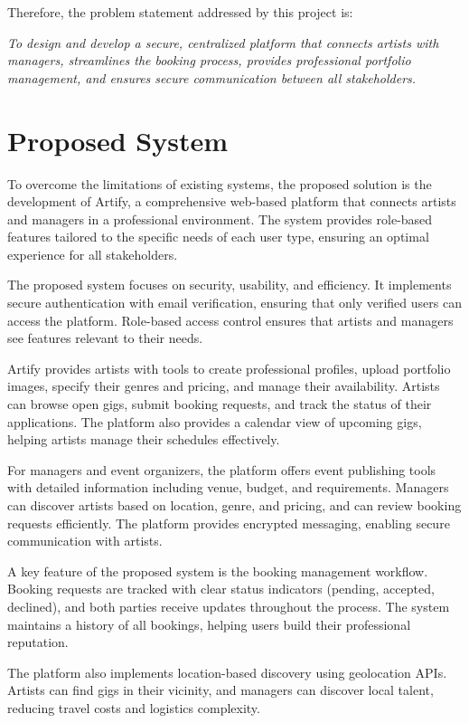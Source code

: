 \documentclass[12pt,a4paper]{report}
\begin{document}
Therefore, the problem statement addressed by this project is:

\textit{To design and develop a secure, centralized platform that connects artists with managers, streamlines the booking process, provides professional portfolio management, and ensures secure communication between all stakeholders.}

\section{Proposed System}
To overcome the limitations of existing systems, the proposed solution is the development of Artify, a comprehensive web-based platform that connects artists and managers in a professional environment. The system provides role-based features tailored to the specific needs of each user type, ensuring an optimal experience for all stakeholders.

The proposed system focuses on security, usability, and efficiency. It implements secure authentication with email verification, ensuring that only verified users can access the platform. Role-based access control ensures that artists and managers see features relevant to their needs.

Artify provides artists with tools to create professional profiles, upload portfolio images, specify their genres and pricing, and manage their availability. Artists can browse open gigs, submit booking requests, and track the status of their applications. The platform also provides a calendar view of upcoming gigs, helping artists manage their schedules effectively.

For managers and event organizers, the platform offers event publishing tools with detailed information including venue, budget, and requirements. Managers can discover artists based on location, genre, and pricing, and can review booking requests efficiently. The platform provides encrypted messaging, enabling secure communication with artists.

A key feature of the proposed system is the booking management workflow. Booking requests are tracked with clear status indicators (pending, accepted, declined), and both parties receive updates throughout the process. The system maintains a history of all bookings, helping users build their professional reputation.

The platform also implements location-based discovery using geolocation APIs. Artists can find gigs in their vicinity, and managers can discover local talent, reducing travel costs and logistics complexity.
\end{document}
